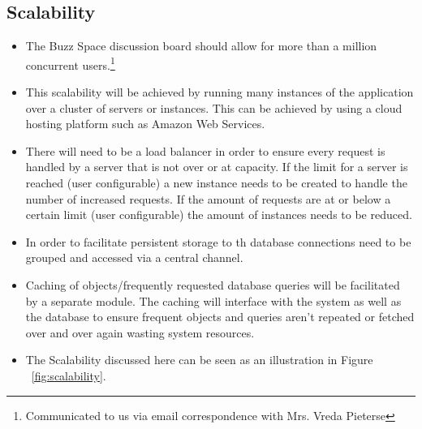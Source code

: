 \documentclass[a4paper,12pt,titlepage]{article}
\begin{document}
\subsection{Scalability}
\begin{itemize}
	\item The Buzz Space discussion board should allow for more than a million concurrent users.\footnote{Communicated to us via email correspondence with Mrs. Vreda Pieterse}
	\item This scalability will be achieved by running many instances of the application over a cluster of servers or instances. This can be achieved by using a cloud hosting platform such as Amazon Web Services.
	\item There will need to be a load balancer in order to ensure every request is handled by a server that is not over or at capacity. If the limit for a server is reached (user configurable) a new instance needs to be created to handle the number of increased requests. If the amount of requests are at or below a certain limit (user configurable) the amount of instances needs to be reduced.
	\item In order to facilitate persistent storage to th database connections need to be grouped and accessed via a central channel. 
	\item Caching of objects/frequently requested database queries will be facilitated by a separate module. The caching will interface with the system as well as the database to ensure frequent objects and queries aren't repeated or fetched over and over again wasting system resources.
	\item The Scalability discussed here can be seen as an illustration in Figure ~\ref{fig:scalability}.
	\begin{figure}[H]
		\centering

\end{figure}
\end{itemize}
\end{document}
